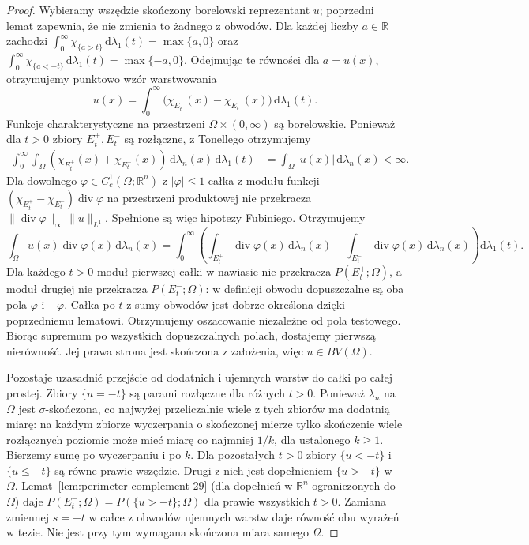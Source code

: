 \begin{proof}
Wybieramy wszędzie skończony borelowski
reprezentant $u$; poprzedni lemat zapewnia,
że nie zmienia to żadnego z obwodów.
Dla każdej liczby $a\in\mathbb R$ zachodzi
$\int_0^\infty\chi_{\{a>t\}}\,\mathrm d\lambda_1(t)
=\max\{a,0\}$ oraz
$\int_0^\infty\chi_{\{a<-t\}}\,\mathrm d\lambda_1(t)
=\max\{-a,0\}$. Odejmując te równości dla
$a=u(x)$, otrzymujemy punktowo wzór warstwowania
\[
 u(x)=\int_0^\infty
 \bigl(\chi_{E_t^+}(x)-\chi_{E_t^-}(x)\bigr)
 \,\mathrm d\lambda_1(t).
\]
Funkcje charakterystyczne na przestrzeni
$\Omega\times(0,\infty)$ są borelowskie.
Ponieważ dla $t>0$ zbiory $E_t^+,E_t^-$
są rozłączne, z Tonellego otrzymujemy
\begin{align*}
 \int_0^\infty\int_\Omega
 (\chi_{E_t^+}(x)+\chi_{E_t^-}(x))
 \,\mathrm d\lambda_n(x)\,\mathrm d\lambda_1(t)
 &=\int_\Omega|u(x)|\,\mathrm d\lambda_n(x)<\infty.
\end{align*}
Dla dowolnego $\varphi\in C_c^1(\Omega;\mathbb R^n)$
z $|\varphi|\le1$ całka z modułu funkcji
$(\chi_{E_t^+}-\chi_{E_t^-})\operatorname{div}\varphi$
na przestrzeni produktowej nie przekracza
$\|\operatorname{div}\varphi\|_\infty\|u\|_{L^1}$.
Spełnione są więc hipotezy Fubiniego.
Otrzymujemy
\[
 \int_\Omega u(x)\operatorname{div}\varphi(x)
 \,\mathrm d\lambda_n(x)
 =\int_0^\infty\!\left(
 \int_{E_t^+}\operatorname{div}\varphi(x)
 \,\mathrm d\lambda_n(x)
 -\int_{E_t^-}\operatorname{div}\varphi(x)
 \,\mathrm d\lambda_n(x)\right)\mathrm d\lambda_1(t).
\]
Dla każdego $t>0$ moduł pierwszej całki
w nawiasie nie przekracza $P(E_t^+;\Omega)$,
a moduł drugiej nie przekracza $P(E_t^-;\Omega)$:
w definicji obwodu dopuszczalne są oba pola
$\varphi$ i $-\varphi$.
Całka po $t$ z sumy obwodów jest dobrze
określona dzięki poprzedniemu lematowi.
Otrzymujemy oszacowanie niezależne od pola
testowego. Biorąc supremum po wszystkich
dopuszczalnych polach, dostajemy pierwszą
nierówność. Jej prawa strona jest skończona
z założenia, więc $u\in BV(\Omega)$.

Pozostaje uzasadnić przejście od dodatnich
i ujemnych warstw do całki po całej prostej.
Zbiory $\{u=-t\}$ są parami rozłączne dla
różnych $t>0$. Ponieważ $\lambda_n$ na $\Omega$
jest $\sigma$-skończona, co najwyżej przeliczalnie
wiele z tych zbiorów ma dodatnią miarę:
na każdym zbiorze wyczerpania o skończonej mierze
tylko skończenie wiele rozłącznych poziomic
może mieć miarę co najmniej $1/k$, dla
ustalonego $k\ge1$. Bierzemy sumę po wyczerpaniu
i po $k$. Dla pozostałych $t>0$ zbiory
$\{u<-t\}$ i $\{u\le-t\}$ są równe prawie wszędzie.
Drugi z nich jest dopełnieniem $\{u>-t\}$
w $\Omega$. Lemat~\ref{lem:perimeter-complement-29}
(dla dopełnień w $\mathbb R^n$ ograniczonych
do $\Omega$) daje
$P(E_t^-;\Omega)=P(\{u>-t\};\Omega)$
dla prawie wszystkich $t>0$.
Zamiana zmiennej $s=-t$ w całce z obwodów
ujemnych warstw daje równość obu wyrażeń
w tezie. Nie jest przy tym wymagana skończona
miara samego $\Omega$.
\end{proof}

